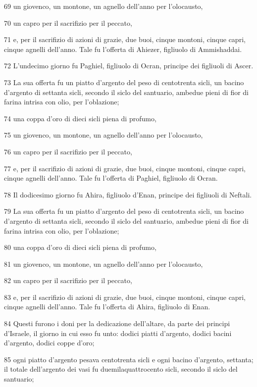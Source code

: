 \par 69 un giovenco, un montone, un agnello dell'anno per l'olocausto,
\par 70 un capro per il sacrifizio per il peccato,
\par 71 e, per il sacrifizio di azioni di grazie, due buoi, cinque montoni, cinque capri, cinque agnelli dell'anno. Tale fu l'offerta di Ahiezer, figliuolo di Ammishaddai.
\par 72 L'undecimo giorno fu Paghiel, figliuolo di Ocran, principe dei figliuoli di Ascer.
\par 73 La sua offerta fu un piatto d'argento del peso di centotrenta sicli, un bacino d'argento di settanta sicli, secondo il siclo del santuario, ambedue pieni di fior di farina intrisa con olio, per l'oblazione;
\par 74 una coppa d'oro di dieci sicli piena di profumo,
\par 75 un giovenco, un montone, un agnello dell'anno per l'olocausto,
\par 76 un capro per il sacrifizio per il peccato,
\par 77 e, per il sacrifizio di azioni di grazie, due buoi, cinque montoni, cinque capri, cinque agnelli dell'anno. Tale fu l'offerta di Paghiel, figliuolo di Ocran.
\par 78 Il dodicesimo giorno fu Ahira, figliuolo d'Enan, principe dei figliuoli di Neftali.
\par 79 La sua offerta fu un piatto d'argento del peso di centotrenta sicli, un bacino d'argento di settanta sicli, secondo il siclo del santuario, ambedue pieni di fior di farina intrisa con olio, per l'oblazione;
\par 80 una coppa d'oro di dieci sicli piena di profumo,
\par 81 un giovenco, un montone, un agnello dell'anno per l'olocausto,
\par 82 un capro per il sacrifizio per il peccato,
\par 83 e, per il sacrifizio di azioni di grazie, due buoi, cinque montoni, cinque capri, cinque agnelli dell'anno. Tale fu l'offerta di Ahira, figliuolo di Enan.
\par 84 Questi furono i doni per la dedicazione dell'altare, da parte dei principi d'Israele, il giorno in cui esso fu unto: dodici piatti d'argento, dodici bacini d'argento, dodici coppe d'oro;
\par 85 ogni piatto d'argento pesava centotrenta sicli e ogni bacino d'argento, settanta; il totale dell'argento dei vasi fu duemilaquattrocento sicli, secondo il siclo del santuario;
